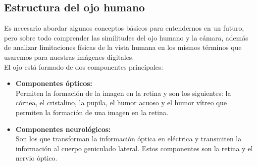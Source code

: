 \subsection{Estructura del ojo humano}
Es necesario abordar algunos conceptos básicos para entendernos en un
futuro, pero sobre todo comprender las similitudes del ojo humano y
la cámara, además de analizar limitaciones físicas de la vista humana
en los mismos términos que usaremos para nuestras imágenes digitales.\\
El ojo está formado de dos componentes principales:
\begin{itemize}
	\item \textbf{Componentes ópticos:} \\Permiten la formación de la imagen en la retina y son los
	      siguientes: la córnea, el cristalino, la pupila, el humor acuoso y el humor vítreo que
	      permiten la formación de una imagen en la retina.
	\item \textbf{Componentes neurológicos:}\\ Son los que transforman la información óptica en
	      eléctrica y transmiten la información al cuerpo geniculado lateral. Estos componentes
	      son la retina y el nervio óptico.
\end{itemize}
